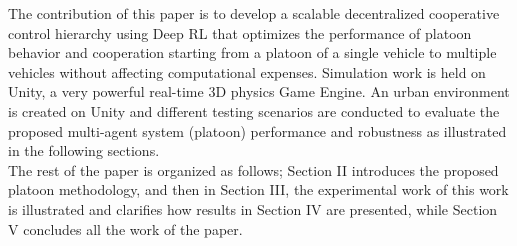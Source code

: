 The contribution of this paper is to develop a scalable decentralized cooperative control hierarchy using Deep RL that optimizes the performance of platoon behavior and cooperation starting from a platoon of a single vehicle to multiple vehicles without affecting computational expenses. Simulation work is held on Unity, a very powerful real-time 3D physics Game Engine. An urban environment is created on Unity and different testing scenarios are conducted to evaluate the proposed multi-agent system (platoon) performance and robustness as illustrated in the following sections.\\
The rest of the paper is organized as follows; Section II introduces the proposed platoon methodology, and then in Section III, the experimental work of this work is illustrated and clarifies how results in Section IV are presented, while Section V concludes all the work of the paper.

